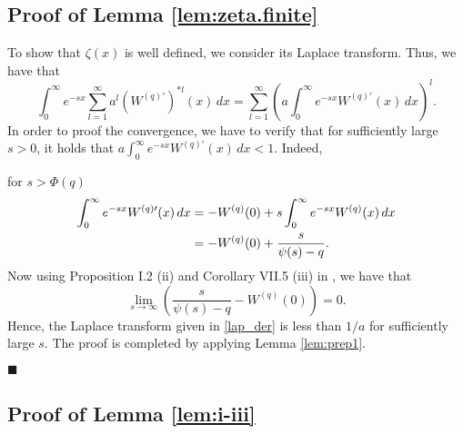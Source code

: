\documentclass[12pt,reqno]{amsart}
\newcommand{\blue}{\textcolor[rgb]{0.00,0.00,1.00}}
\theoremstyle{definition}
\theoremstyle{remark}
\begin{document}
\subsection{Proof of Lemma \ref{lem:zeta.finite}}
     To show that $\zeta(x)$ is well defined, we consider its Laplace transform.
     Thus, we have that
     $$\int_0^\infty e^{-sx}\sum_{l=1}^\infty a^l 
{(W^{(q)\prime})}^{*l}(x)\,dx=\sum_{l=1}^\infty \left(a\int_0^\infty e^{-sx}{W^{(q)\prime}}(x)\,dx\right)^l.$$
In order to proof the convergence, we have to verify that for sufficiently large $s>0$, it holds that $a\int_0^\infty e^{-sx}{W^{(q)\prime}}(x)\,dx<1$. 
Indeed,
\begin{comment}
For $q=0$ 
$$  \int_0^\infty e^{-sx}W^{\prime}(x)\,dx \le   \int_0^\infty W^{\prime}(x)\,dx=W(\infty)-W(0)<\infty,$$
for all $s>0$, so by Lemma \ref{lem:prep1} the statement is true.
  For $q>0$, we use {the representation $W^{(q)}(x)=e^{\Phi(q)x}W_{\Phi(q)}(x)$}
from which 
${W^{(q)\prime}}(x)=\Phi(q)e^{\Phi(q)x}W_{\Phi(q)}(x)+e^{\Phi(q)x}W^{\prime}_{\Phi(q)}(x)$
(the derivative exists besides a denumerable number of points) \blue{remove this expression?}.
Then \blue{for $s>\Phi(q)$}
\begin{align*}
\int_0^\infty e^{-sx}\blue{W^{(q)\prime}}(x)\,dx&=\Phi(q)\int_0^\infty e^{-(s-\Phi(q))x}W_{\Phi(q)}(x)\,dx+\int_0^\infty  e^{-(s-\Phi(q))x}W^{\prime}_{\Phi(q)}(x)\,dx
\end{align*}
is finite for big enough $s$.
\blue{I guess it is easier using an integration by parts?
\end{comment}
 for $s>\Phi(q)$
\begin{align}\label{lap_der}
\int_0^\infty e^{-sx}{W^{(q)\prime}}(x)\,dx&=-W^{(q)}(0)+s\int_0^\infty e^{-sx}{W^{(q)}}(x)\,dx\notag\\
&=-W^{(q)}(0)+\frac{s}{\psi(s)-q}.
\end{align}
Now using Proposition I.2 (ii) and Corollary VII.5 (iii) in \cite{bertoin1996}, we have that 
\begin{equation}\label{limit_LT}
\lim_{s\to\infty}\left(\frac{s}{\psi(s)-q}-W^{(q)}(0)\right)=0.
\end{equation}
Hence, the Laplace transform given in \eqref{lap_der} is less than $1/a$ for sufficiently large $s$.
The proof is completed by applying Lemma \ref{lem:prep1}.
\begin{flushright}$\blacksquare$\end{flushright}

\subsection{Proof of Lemma \ref{lem:i-iii}}
  
\end{document}
